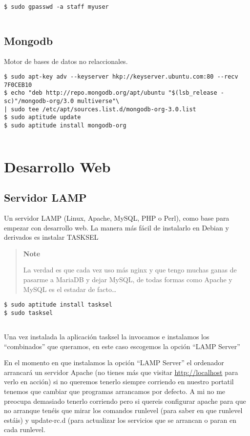 \begin{verbatim}
$ sudo gpasswd -a staff myuser
      
\end{verbatim}

\subsection{Mongodb}\label{mongodb}

Motor de bases de datos no relaccionales.

\begin{verbatim}
$ sudo apt-key adv --keyserver hkp://keyserver.ubuntu.com:80 --recv 7F0CEB10
$ echo "deb http://repo.mongodb.org/apt/ubuntu "$(lsb_release -sc)"/mongodb-org/3.0 multiverse"\
| sudo tee /etc/apt/sources.list.d/mongodb-org-3.0.list
$ sudo aptitude update
$ sudo aptitude install mongodb-org
      
\end{verbatim}

\section{Desarrollo Web}\label{desarrollo-web}

\subsection{Servidor LAMP}\label{servidor-lamp}

Un servidor LAMP (Linux, Apache, MySQL, PHP o Perl), como base para
empezar con desarrollo web. La manera más fácil de instalarlo en Debian
y derivados es instalar TASKSEL

\begin{quote}
\textbf{Note}

La verdad es que cada vez uso más nginx y que tengo muchas ganas de
pasarme a MariaDB y dejar MySQL, de todas formas como Apache y MySQL es
el estadar de facto\ldots{}
\end{quote}

\begin{verbatim}
$ sudo aptitude install tasksel
$ sudo tasksel
      
\end{verbatim}

Una vez instalada la aplicación tasksel la invocamos e instalamos los
``combinados'' que queramos, en este caso escogemos la opción ``LAMP
Server''

En el momento en que instalamos la opción ``LAMP Server'' el ordenador
arrancará un servidor Apache (no tienes más que visitar
\url{http://localhost} para verlo en acción) si no queremos tenerlo
siempre corriendo en nuestro portatil tenemos que cambiar que programas
arrancamos por defecto. A mi no me preocupa demasiado tenerlo corriendo
pero si quereis configurar apache para que no arranque tenéis que mirar
los comandos runlevel (para saber en que runlevel estáis) y update-rc.d
(para actualizar los servicios que se arrancan o paran en cada runlevel.

